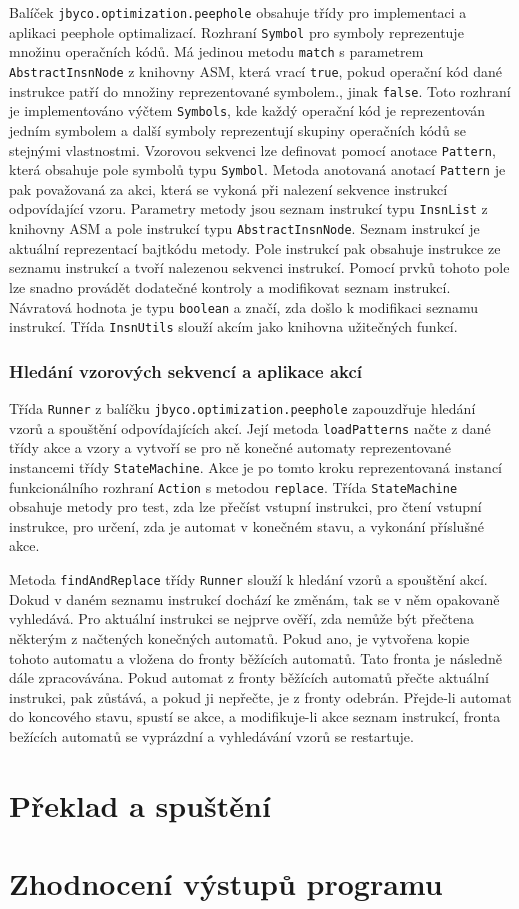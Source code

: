 Balíček \texttt{jbyco.optimization.peephole} obsahuje třídy pro implementaci a aplikaci peephole optimalizací. Rozhraní \texttt{Symbol} pro symboly reprezentuje množinu operačních kódů. Má jedinou metodu \texttt{match} s parametrem \texttt{AbstractInsnNode} z knihovny ASM, která vrací \texttt{true}, pokud operační kód dané instrukce patří do množiny reprezentované symbolem., jinak \texttt{false}. Toto rozhraní je implementováno výčtem \texttt{Symbols}, kde každý operační kód je reprezentován jedním symbolem a další symboly reprezentují skupiny operačních kódů se stejnými vlastnostmi. Vzorovou sekvenci lze definovat pomocí anotace \texttt{Pattern}, která obsahuje pole symbolů typu \texttt{Symbol}. Metoda anotovaná anotací \texttt{Pattern} je pak považovaná za akci, která se vykoná při nalezení sekvence instrukcí odpovídající vzoru. Parametry metody jsou seznam instrukcí typu \texttt{InsnList} z knihovny ASM a pole instrukcí typu \texttt{AbstractInsnNode}. Seznam instrukcí je aktuální reprezentací bajtkódu metody. Pole instrukcí pak obsahuje instrukce ze seznamu instrukcí a tvoří nalezenou sekvenci instrukcí. Pomocí prvků tohoto pole lze snadno provádět dodatečné kontroly a modifikovat seznam instrukcí. Návratová hodnota je typu \texttt{boolean} a značí, zda došlo k modifikaci seznamu instrukcí. Třída \texttt{InsnUtils} slouží akcím jako knihovna užitečných funkcí.

\subsubsection{Hledání vzorových sekvencí a aplikace akcí}

Třída \texttt{Runner} z balíčku \texttt{jbyco.optimization.peephole} zapouzdřuje hledání vzorů a spouštění odpovídajících akcí. Její metoda \texttt{loadPatterns} načte z dané třídy akce a vzory a vytvoří se pro ně konečné automaty reprezentované instancemi třídy \texttt{StateMachine}. Akce je po tomto kroku reprezentovaná instancí funkcionálního rozhraní \texttt{Action} s metodou \texttt{replace}. Třída \texttt{StateMachine} obsahuje metody pro test, zda lze přečíst vstupní instrukci, pro čtení vstupní instrukce, pro určení, zda je automat v konečném stavu, a vykonání příslušné akce. 

Metoda \texttt{findAndReplace} třídy \texttt{Runner} slouží k hledání vzorů a spouštění akcí. Dokud v daném seznamu instrukcí dochází ke změnám, tak se v něm opakovaně vyhledává. Pro aktuální instrukci se nejprve ověří, zda nemůže být přečtena některým z načtených konečných automatů. Pokud ano, je vytvořena kopie tohoto automatu a vložena do fronty běžících automatů. Tato fronta je následně dále zpracovávána. Pokud automat z fronty běžících automatů přečte aktuální instrukci, pak zůstává, a pokud ji nepřečte, je z fronty odebrán. Přejde-li automat do koncového stavu, spustí se akce, a modifikuje-li akce seznam instrukcí, fronta bežících automatů se vyprázdní a vyhledávání vzorů se restartuje.

\section{Překlad a spuštění}


\section{Zhodnocení výstupů programu}\label{Implementation:Results}
